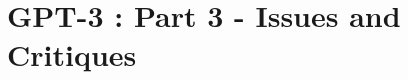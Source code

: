 \chapter*{GPT-3 : Part 3 - Issues and Critiques}
\label{chap:critiques}
\thispagestyle{fancy}
\vspace*{\fill}
